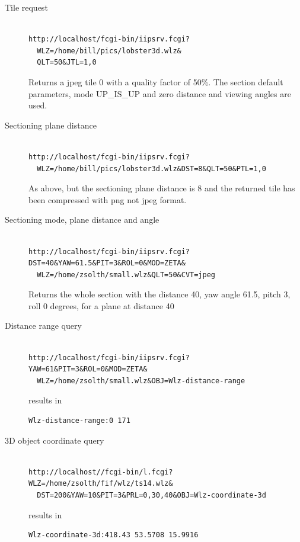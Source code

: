 \documentclass[11pt]{article}
\begin{document}
\begin{description}
\item[Tile request]
\begin{verbatim}

http://localhost/fcgi-bin/iipsrv.fcgi?
  WLZ=/home/bill/pics/lobster3d.wlz&
  QLT=50&JTL=1,0
\end{verbatim}

Returns a jpeg tile 0 with a quality factor of 50\%.
The section default parameters, mode UP\_IS\_UP and zero distance and viewing
angles are used.


\item[Sectioning plane distance]
\begin{verbatim}

http://localhost/fcgi-bin/iipsrv.fcgi?
  WLZ=/home/bill/pics/lobster3d.wlz&DST=8&QLT=50&PTL=1,0
\end{verbatim}
As above, but the sectioning plane distance is 8 and the returned tile has
been compressed with png not jpeg format.

\item[Sectioning mode, plane distance and angle]
\begin{verbatim}

http://localhost/fcgi-bin/iipsrv.fcgi?DST=40&YAW=61.5&PIT=3&ROL=0&MOD=ZETA&
  WLZ=/home/zsolth/small.wlz&QLT=50&CVT=jpeg
\end{verbatim}
Returns the whole section with the distance 40, yaw angle 61.5, pitch 3,
roll 0 degrees, for a plane at distance 40 

\item[Distance range query]
\begin{verbatim}

http://localhost/fcgi-bin/iipsrv.fcgi?YAW=61&PIT=3&ROL=0&MOD=ZETA&
  WLZ=/home/zsolth/small.wlz&OBJ=Wlz-distance-range
\end{verbatim}
results in
\begin{verbatim}
Wlz-distance-range:0 171
\end{verbatim}

\item[3D object coordinate query]
\begin{verbatim}

http://localhost//fcgi-bin/l.fcgi?WLZ=/home/zsolth/fif/wlz/ts14.wlz&
  DST=200&YAW=10&PIT=3&PRL=0,30,40&OBJ=Wlz-coordinate-3d
\end{verbatim}
results in
\begin{verbatim}
Wlz-coordinate-3d:418.43 53.5708 15.9916
\end{verbatim}


\end{description}
\end{document}
